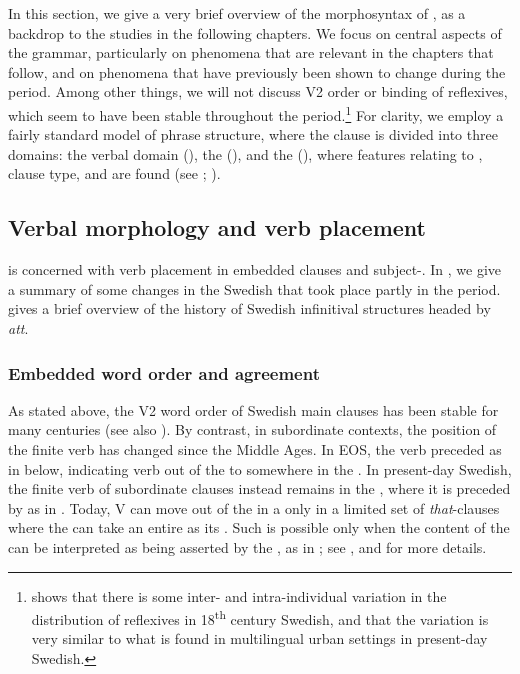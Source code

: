 \documentclass[output=paper]{langscibook}
\begin{document}
In this section, we give a very brief overview of the morphosyntax of , as a backdrop to the studies in the following chapters. We focus on central aspects of the grammar, particularly on phenomena that are relevant in the chapters that follow, and on phenomena that have previously been shown to change during the  period. Among other things, we will not discuss V2 order or binding of reflexives, which seem to have been stable throughout the  period.\footnote{\citet{Tingsell2010} shows that there is some inter- and intra-individual variation in the distribution of reflexives in 18\textsuperscript{th} century Swedish, and that the variation is very similar to what is found in multilingual urban settings in present-day Swedish.}  For clarity, we employ a fairly standard model of phrase structure, where the clause is divided into three domains: the verbal domain (), the  (), and the  (), where features relating to , clause type, and  are found (see \citealt{Platzack2010}; \citealt{Faarlund2019}). 


\subsection{Verbal morphology and verb placement}\label{sec:intro:3.1}


 is concerned with verb placement in embedded clauses and subject-. In , we give a summary of some changes in the Swedish  that took place partly in the  period.  gives a brief overview of the history of Swedish infinitival structures headed by \textit{att}.


\subsubsection{Embedded word order and agreement}\label{sec:intro:3.1.1}


As stated above, the V2 word order of Swedish main clauses has been stable for many centuries (see also \citealt{Alving1916}). By contrast, in subordinate contexts, the position of the finite verb has changed since the Middle Ages. In EOS, the verb preceded  as in  below, indicating verb  out of the  to somewhere in the . In present-day Swedish, the finite verb of subordinate clauses instead remains in the , where it is preceded by  as in . Today, V can move out of the  in a  only in a limited set of \textit{that}{}-clauses where the  can take an entire  as its . Such   is possible only when the content of the  can be interpreted as being asserted by the , as in ; see \citet{Julien2015},  and  for more details.
\end{document}

